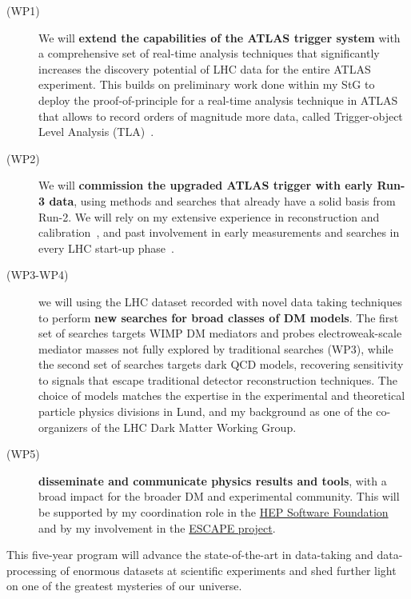 \begin{description}


\item[(WP1)] We will \textbf{extend the capabilities of the ATLAS trigger system} with a comprehensive set of real-time analysis techniques that significantly increases the discovery potential of LHC data for the entire ATLAS experiment. This builds on preliminary work done within my StG to deploy the proof-of-principle for a real-time analysis technique in ATLAS that allows to record orders of magnitude more data, called Trigger-object Level Analysis (TLA)~\cite{Aaboud:2018fzt}.
\item[(WP2)] We will \textbf{commission the upgraded ATLAS trigger with early Run-3 data}, using methods and searches that already have a solid basis from Run-2. We will rely on my extensive experience in reconstruction and calibration~\cite{Aad:2014bia,Aaboud:2018kfi}, and past involvement in early measurements and searches in every LHC start-up phase~\cite{Doglioni:2011ema,Aad:2014aqa,ATLAS:2015nsi}. %
\item[(WP3-WP4)] we will using the LHC dataset recorded with novel data taking techniques to perform \textbf{new searches for broad classes of DM models}. The first set of searches targets WIMP DM mediators and probes electroweak-scale mediator masses not fully explored by traditional searches (WP3), while the second set of searches targets dark QCD models, recovering sensitivity to signals that escape traditional detector reconstruction techniques. The choice of models matches the expertise in the experimental and theoretical particle physics divisions in Lund, and my background as one of the co-organizers of the LHC Dark Matter Working Group. 
\item[(WP5)] \textbf{disseminate and communicate physics results and tools}, with a broad impact for the broader DM and experimental community. This will be supported by my coordination role in the \href{https://hepsoftwarefoundation.org}{HEP Software Foundation} and by my involvement in the \href{https://projectescape.eu}{ESCAPE project}.

\end{description}

This five-year program will advance the state-of-the-art in data-taking and data-processing of enormous datasets at scientific experiments and shed further light on one of the greatest mysteries of our universe. 





